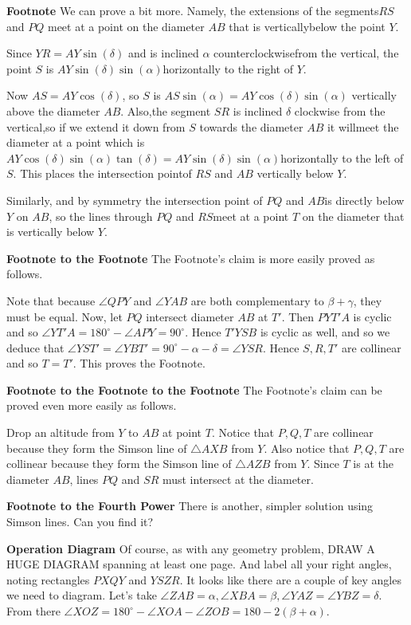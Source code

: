 \begin{enumerate}
 \textbf{Footnote} We can prove a bit more. Namely, the extensions of the segments$RS$ and $PQ$ meet at a point on the diameter $AB$ that is verticallybelow the point $Y$.

 Since $YR = AY \sin(\delta)$ and is inclined $\alpha$ counterclockwisefrom the vertical, the point $S$ is $AY \sin(\delta) \sin(\alpha)$horizontally to the right of $Y$.

 Now $AS = AY \cos(\delta)$, so $S$ is $AS \sin(\alpha) = AY \cos(\delta)\sin(\alpha)$ vertically above the diameter $AB$. Also,the segment $SR$ is inclined $\delta$ clockwise from the vertical,so if we extend it down from $S$ towards the diameter $AB$ it willmeet the diameter at a point which is$AY \cos(\delta)\sin(\alpha)\tan(\delta) = AY \sin(\delta)\sin(\alpha)$horizontally to the left of $S$. This places the intersection pointof $RS$ and $AB$ vertically below $Y$.

 Similarly, and by symmetry the intersection point of $PQ$ and $AB$is directly below $Y$ on $AB$, so the lines through $PQ$ and $RS$meet at a point $T$ on the diameter that is vertically below $Y$.

 \textbf{Footnote to the Footnote} The Footnote's claim is more easily proved as follows.

 Note that because $\angle{QPY}$ and $\angle{YAB}$ are both complementary to $\beta + \gamma$, they must be equal. Now, let $PQ$ intersect diameter $AB$ at $T'$. Then $PYT'A$ is cyclic and so $\angle{YT'A} = 180^\circ - \angle{APY} = 90^\circ$. Hence $T'YSB$ is cyclic as well, and so we deduce that $\angle{YST'} = \angle{YBT'} = 90^\circ - \alpha - \delta = \angle{YSR}.$ Hence $S, R, T'$ are collinear and so $T = T'$. This proves the Footnote.

 \textbf{Footnote to the Footnote to the Footnote} The Footnote's claim can be proved even more easily as follows.

 Drop an altitude from $Y$ to $AB$ at point $T$.  Notice that $P, Q, T$ are collinear because they form the Simson line of $\triangle AXB$ from $Y$.  Also notice that $P, Q, T$ are collinear because they form the Simson line of $\triangle AZB$ from $Y$.  Since $T$ is at the diameter $AB$, lines $PQ$ and $SR$ must intersect at the diameter.

 \textbf{Footnote to the Fourth Power} There is another, simpler solution using Simson lines. Can you find it?

 \textbf{Operation Diagram} Of course, as with any geometry problem, DRAW A HUGE DIAGRAM spanning at least one page. And label all your right angles, noting rectangles $PXQY$ and $YSZR$. It looks like there are a couple of key angles we need to diagram. Let's take $\angle{ZAB} = \alpha, \angle{XBA} = \beta, \angle{YAZ} = \angle{YBZ} = \delta$. From there $\angle{XOZ}=180^\circ - \angle{XOA}-\angle{ZOB}=180-2(\beta + \alpha)$.


\end{enumerate}
